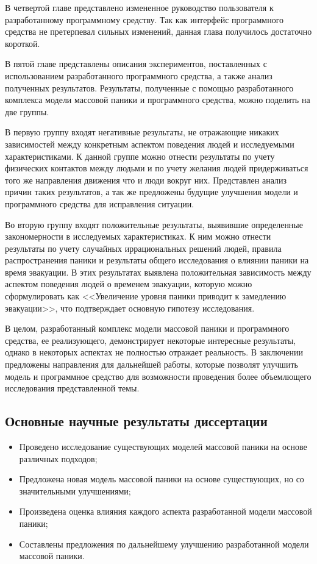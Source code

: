В четвертой главе представлено измененное руководство пользователя к разработанному программному средству.
Так как интерфейс программного средства не претерпевал сильных изменений, данная глава получилось достаточно короткой.

В пятой главе представлены описания экспериментов, поставленных с использованием разработанного программного средства,
а также анализ полученных результатов. Результаты, полученные с помощью разработанного комплекса модели массовой паники и
программного средства, можно поделить на две группы.

В первую группу входят негативные результаты, не отражающие
никаких зависимостей между конкретным аспектом поведения людей и исследуемыми характеристиками.
К данной группе можно отнести результаты по учету физических контактов между людьми и по учету
желания людей придерживаться того же направления движения что и люди вокруг них.
Представлен анализ причин таких результатов, а так же предложены будущие улучшения модели и программного средства
для исправления ситуации.

Во вторую группу входят положительные результаты, выявившие определенные закономерности
в исследуемых характеристиках. К ним можно отнести результаты по учету случайных иррациональных решений
людей, правила распространения паники и результаты общего исследования о влиянии паники на время эвакуации.
В этих результатах выявлена положительная зависимость между аспектом поведения людей о временем эвакуации,
которую можно сформулировать как <<Увеличение уровня паники приводит к замедлению эвакуации>>,
что подтверждает основную гипотезу исследования.

В целом, разработанный комплекс модели массовой паники и программного средства, ее реализующего,
демонстрирует некоторые интересные результаты, однако в некоторых аспектах не полностью отражает реальность.
В заключении предложены направления для дальнейшей работы, которые позволят улучшить модель и программное средство
для возможности проведения более объемлющего исследования представленной темы.


\subsection*{\textbf{Основные научные результаты диссертации}}

\begin{itemize}
  \item Проведено исследование существующих моделей массовой паники на основе различных подходов;
  \item Предложена новая модель массовой паники на основе существующих, но со значительными улучшениями;
  \item Произведена оценка влияния каждого аспекта разработанной модели массовой паники;
  \item Составлены предложения по дальнейшему улучшению разработанной модели массовой паники.
\end{itemize}


\renewcommand{\bibsection}{\sectioncentered*{Список опубликованных работ}}

\nocite{mypub}


